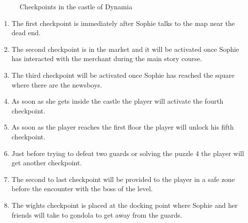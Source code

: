\begin{center}
\begin{figure}[H]
    \caption{Checkpoints in the castle of Dynamia}
  \end{figure}
 \begin{enumerate}
 \item The first checkpoint is immediately after Sophie talks to the map near the dead end.
 \item The second checkpoint is in the market and it will be activated once Sophie has interacted with the merchant during the main story course.
 \item The third checkpoint will be activated once Sophie has reached the square where there are the newsboys.
 \item As soon as she gets inside the castle the player will activate the fourth checkpoint.
 \item As soon as the player reaches the first floor the player will unlock his fifth checkpoint.
 \item Just before trying to defeat two guards or solving the puzzle 4  the player will get another checkpoint.
 \item The second to last checkpoint will be provided to the player in a safe zone before the encounter with the boss of the level.
 \item The wights checkpoint is placed at the docking point where Sophie and her friends will take to gondola to get away from the guards.
 \end{enumerate}

\end{center}
